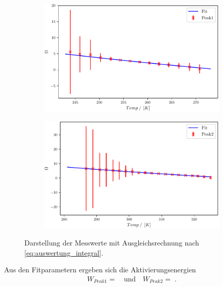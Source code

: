 \begin{figure}
\centering
\begin{subfigure}{0.5\textwidth}
	\centering
	\includegraphics[width=1\textwidth]{build/1_Temp_current_peak_log_3.pdf}
	\caption{}
	\label{fig:Auswertung_9}
\end{subfigure}%
\begin{subfigure}{0.5\textwidth}
	\centering
	\includegraphics[width=1\textwidth]{build/1_Temp_current_peak2_log_3.pdf}
	\caption{}
	\label{fig:Auswertung_10}
\end{subfigure}
\caption{Darstellung der Messwerte mit Ausgleichsrechnung nach \ref{eq:auswertung_integral}.}
\label{fig:Auswertung_9_10}
\end{figure}

Aus den Fitparametern ergeben sich die Aktivierungsenergien 
\begin{align}
	W_{Peak1} =   \quad \text{und} \quad W_{Peak2} = \;.
\end{align}

